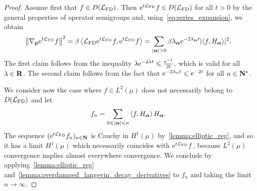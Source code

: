 \documentclass[11pt,a4paper]{article}
\begin{document}
\begin{proof}
    Assume first that $f \in D(\mathcal L_{\rm FD})$.
    Then $\mathrm{e}^{t \mathcal L_{\rm FD} } f \in D(\mathcal L_{\rm FD})$ for all $t > 0$ by the general properties of operator semigroups and,
    using~\eqref{eq:series_expansion}, we obtain
    \begin{equation}
        \label{eq:gradient_series}
        \norm{\grad_{\vect p} \e^{t \mathcal L_{\rm FD}} f}^2 = \beta \ip{\mathcal L_{\rm FD} \e^{t \mathcal L_{\rm FD}} f}{\e^{t \mathcal L_{\rm FD}} f}
        = \sum_{\abs{\vect \alpha} > 0} \beta \lambda_{\vect \alpha} \e^{- 2\lambda_{\vect \alpha} t} \lvert \ip{f}{H_{\vect \alpha}} \rvert^2.
    \end{equation}
    The first claim follows from the inequality
    \(
        \lambda \mathrm{e}^{- 2\lambda t} \leqslant \frac{\mathrm{e}^{-1}}{2 t},
    \)
    which is valid for all $\lambda \in \mathbf R$.
    The second claim follows from the fact that $\mathrm{e}^{-2\lambda_n t} \leqslant \mathrm{e}^{-2t}$ for all $n \in \mathbf N^*$.


    We consider now the case where $f \in L^2(\mu)$ does not necessarily belong to $D(\mathcal L_{\rm FD})$
    and let
    \[
        f_n = \sum_{0 \leq \abs{\vect \alpha} \leq n} \ip{f}{H_{\vect \alpha}} H_{\vect \alpha}.
    \]
    The sequence $(\mathrm{e}^{t \mathcal L_{\rm FD}}f_n)_{n\in \mathbf N}$ is Cauchy in $H^1(\mu)$ by~\eqref{lemma:elliptic_reg},
    and so it has a limit $H^1(\mu)$ which necessarily coincides with $\mathrm{e}^{t \mathcal L_{\rm FD}} f$,
    because $L^2(\mu)$ convergence implies almost everywhere convergence.
    We conclude by applying~\eqref{lemma:elliptic_reg} and~\eqref{lemma:overdamped_langevin_decay_derivatives} to $f_n$ and taking the limit $n \to \infty$.
\end{proof}


\end{document}
